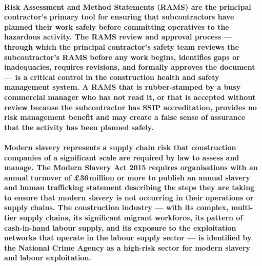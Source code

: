 \paragraph{Risk Assessment and Method Statements (RAMS) are the principal contractor's primary tool for ensuring that subcontractors have planned their work safely before committing operatives to the hazardous activity. The RAMS review and approval process --- through which the principal contractor's safety team reviews the subcontractor's RAMS before any work begins, identifies gaps or inadequacies, requires revisions, and formally approves the document --- is a critical control in the construction health and safety management system. A RAMS that is rubber-stamped by a busy commercial manager who has not read it, or that is accepted without review because the subcontractor has SSIP accreditation, provides no risk management benefit and may create a false sense of assurance that the activity has been planned safely.}

\paragraph{Modern slavery represents a supply chain risk that construction companies of a significant scale are required by law to assess and manage. The Modern Slavery Act 2015 requires organisations with an annual turnover of \pounds36\,million or more to publish an annual slavery and human trafficking statement describing the steps they are taking to ensure that modern slavery is not occurring in their operations or supply chains. The construction industry --- with its complex, multi-tier supply chains, its significant migrant workforce, its pattern of cash-in-hand labour supply, and its exposure to the exploitation networks that operate in the labour supply sector --- is identified by the National Crime Agency as a high-risk sector for modern slavery and labour exploitation.}



